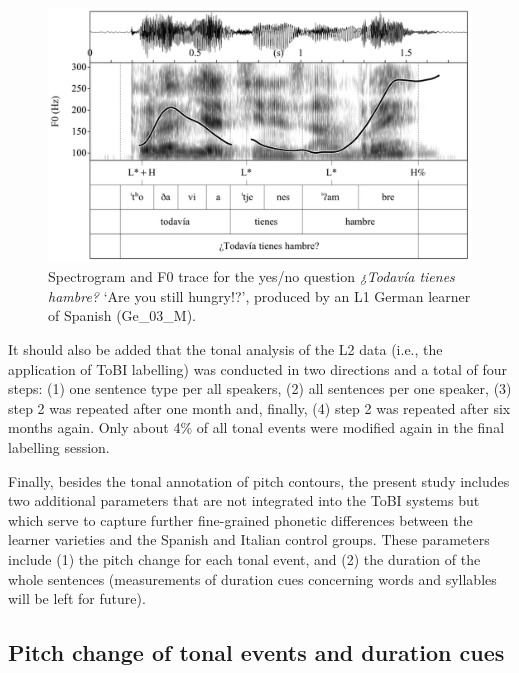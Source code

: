\begin{figure}
\includegraphics[width=\textwidth]{figures/a03HabilMethodology-img007-new.png}



\caption{Spectrogram and F0 trace for the yes/no question \textit{¿Todavía tienes hambre?} ‘Are you still hungry!?’, produced by an L1 German learner of Spanish (Ge\_03\_M).}
\label{fig:3.7}
\end{figure}


It should also be added that the tonal analysis of the L2 data (i.e., the application of ToBI labelling) was conducted in two directions and a total of four steps: (1) one sentence type per all speakers, (2) all sentences per one speaker, (3) step 2 was repeated after one month and, finally, (4) step 2 was repeated after six months again. Only about 4\% of all tonal events were modified again in the final labelling session.



Finally, besides the tonal annotation of pitch contours, the present study includes two additional parameters that are not integrated into the ToBI systems but which serve to capture further fine-grained phonetic differences between the learner varieties and the Spanish and Italian control groups. These parameters include (1) the pitch change for each tonal event, and (2) the duration of the whole sentences (measurements of duration cues concerning words and syllables will be left for future).


\subsection{Pitch change of tonal events and duration cues}\label{sec:3.4.2}

